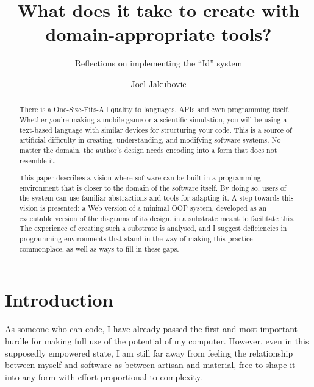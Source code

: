 \newcommand{\OROM}{Id}
\title{What does it take to create with domain-appropriate tools?}
\subtitle{Reflections on implementing the ``Id{}'' system}
\author[ ]{Joel Jakubovic}

\newcommand{\joel}[1]{}
\newcommand{\svgel}[1]{\texttt{\textless{}#1\textgreater{}}}
\newcommand{\OSFA}{One-Size-Fits-All}
\newcommand{\xywh}{\texttt{x},\texttt{y},\texttt{width},\texttt{height}}

\begin{abstract}
There is a One-Size-Fits-All{} quality to languages, APIs and even programming itself. Whether you're making a mobile game or a scientific simulation, you will be using a text-based language with similar devices for structuring your code. This is a source of artificial difficulty in creating, understanding, and modifying software systems. No matter the domain, the author's design needs encoding into a form that does not resemble it.

This paper describes a vision where software can be built in a programming environment that is closer to the domain of the software itself. By doing so, users of the system can use familiar abstractions and tools for adapting it. A step towards this vision is presented: a Web version of a minimal OOP system, developed as an executable version of the diagrams of its design, in a substrate meant to facilitate this. The experience of creating such a substrate is analysed, and I suggest deficiencies in programming environments that stand in the way of making this practice commonplace, as well as ways to fill in these gaps.
\end{abstract}

\maketitle


\hypertarget{introduction}{%
\section{Introduction}\label{introduction}}

As someone who can code, I have already passed the first and most
important hurdle for making full use of the potential of my computer.
However, even in this supposedly empowered state, I am still far away
from feeling the relationship between myself and software as between
artisan and material, free to shape it into any form with effort
proportional to complexity.

